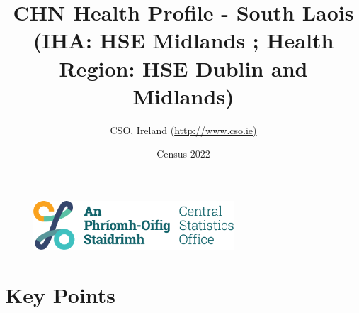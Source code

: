 \documentclass{article}
\title{CHN Health Profile - South Laois (IHA: HSE Midlands ;  Health Region: HSE Dublin and Midlands) }
\date{Census 2022}
\author{CSO, Ireland  (\url{http://www.cso.ie)}}
\begin{document}


\begin{figure}
	\centering
\includegraphics[width =75mm]{../figures/CSO_Logo.png}
\end{figure}

				 
		   
						  
														  
																																													
												 
			 
\maketitle
					
													   
				 
						 
																																																																											   
				 
				  
  \pagebreak
    	    \tableofcontents

\pagebreak


\section{Key Points}
\end{document}

